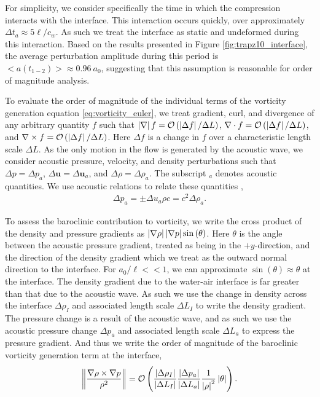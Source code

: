 For simplicity, we consider specifically the time in which the
compression interacts with the interface. This interaction occurs
quickly, over approximately $\Delta t_a\approx5\ell/c_{w}$. As such we
treat the interface as static and undeformed during this
interaction. Based on the results presented in Figure
\ref{fig:trapz10_interface}, the average perturbation amplitude during
this period is $<a(t_{1-2})>\approx0.96\ a_0$, suggesting that this
assumption is reasonable for order of magnitude analysis.

To evaluate the order of magnitude of the individual terms of the
vorticity generation equation \eqref{eq:vorticity_euler}, we treat
gradient, curl, and divergence of any arbitrary quantity $f$ such that
$\left|\nabla\right| f= \mathcal{O}\left(\left|\Delta f\right|/\Delta L\right)$,
$\nabla\cdot f=\mathcal{O}\left(\left|\Delta f\right|/\Delta L\right)$, and
$\nabla\times f=\mathcal{O}\left(\left|\Delta f\right|/\Delta L\right)$. Here
$\Delta f$ is a change in $f$ over a characteristic length scale
$\Delta L$. As the only motion in the flow is generated by the
acoustic wave, we consider acoustic pressure, velocity, and density
perturbations such that $\Delta p=\Delta p_a$,
$\Delta \boldsymbol{u}=\Delta \boldsymbol{u}_a$, and
$\Delta \rho=\Delta \rho_a$. The subscript $_a$ denotes acoustic
quantities. We use acoustic relations to relate these quantities
\citep{Anderson1990},
\begin{align}%
  \label{eq:acoustic_relations}%
  \Delta p_a=\pm\Delta u_a \rho c=c^2\Delta \rho_a.%
\end{align}

To assess the baroclinic contribution to vorticity, we write the cross
product of the density and pressure gradients as
$\left|\nabla \rho\right| \left|\nabla p\right| \sin{\left(\theta\right)}$. Here
$\theta$ is the angle between the acoustic pressure gradient, treated
as being in the $\plus y$-direction, and the direction of the density
gradient which we treat as the outward normal direction to the
interface. For $a_0/\ell<<1$, we can approximate
$\sin{\left(\theta\right)}\approx\theta$ at the interface. The density
gradient due to the water-air interface is far greater than that due
to the acoustic wave. As such we use the change in density across the
interface $\Delta \rho_I$ and associated length scale $\Delta L_I$ to
write the density gradient. The pressure change is a result of the
acoustic wave, and as such we use the acoustic pressure change
$\Delta p_a$ and associated length scale $\Delta L_a$ to express the
pressure gradient. And thus we write the order of magnitude of the
baroclinic vorticity generation term at the interface,
\begin{align}
  \label{eq:baroclinic_vorticity}%
  \norm{\frac{\nabla\rho\times\nabla p}{\rho^2}} =%
  \orderof{\frac{\abs{\Delta \rho_I}}{\abs{\Delta L_I}}\frac{\abs{\Delta p_a}}{\abs{\Delta L_a}}\frac{1}{\abs{\rho}^2}\abs{\theta}}.%
\end{align}

